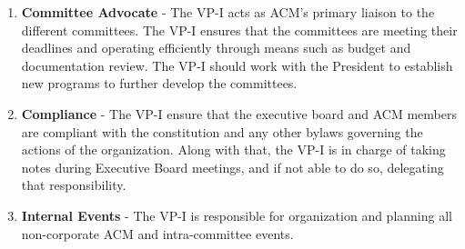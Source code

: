\begin{enumerate}[label=\Alph*.]
\begin{enumerate}[label=\arabic*.]
        \begin{enumerate}[label=\alph*.]
          \item \textbf{Committee Advocate} - The VP-I acts as ACM's primary
            liaison to the different committees. The VP-I ensures that the
            committees are meeting their deadlines and operating efficiently
            through means such as budget and documentation review. The VP-I
            should work with the President to establish new programs to further
            develop the committees.
          \item \textbf{Compliance} - The VP-I ensure that the executive board
            and ACM members are compliant with the constitution and any other
            bylaws governing the actions of the organization. Along with that,
            the VP-I is in charge of taking notes during Executive Board
            meetings, and if not able to do so, delegating that responsibility.
          \item \textbf{Internal Events} - The VP-I is responsible for
            organization and planning all non-corporate ACM and intra-committee
            events.
        \end{enumerate}


\end{enumerate}
\end{enumerate}
